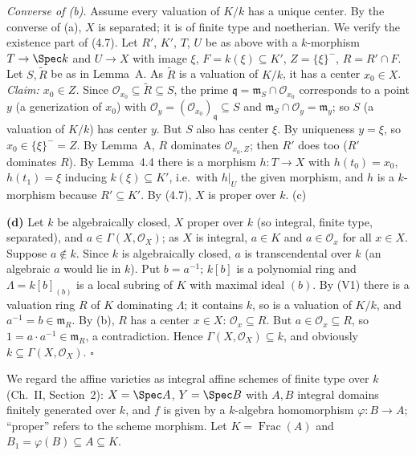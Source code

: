 \documentclass[11pt]{article}
\begin{document}
\emph{Converse of (b).} Assume every valuation of $K/k$ has a unique center. By the converse of (a), $X$ is separated; it is of finite type and noetherian. We verify the existence part of (4.7). Let $R'$, $K'$, $T$, $U$ be as above with a $k$-morphism $T\to\Spec k$ and $U\to X$ with image $\xi$, $F=k(\xi)\subseteq K'$, $Z=\{\xi\}^-$, $R=R'\cap F$. Let $S,\tilde R$ be as in Lemma~A. As $\tilde R$ is a valuation of $K/k$, it has a center $x_0\in X$. \emph{Claim: $x_0\in Z$.} Since $\mathcal O_{x_0}\subseteq\tilde R\subseteq S$, the prime $\mathfrak q=\mathfrak m_S\cap\mathcal O_{x_0}$ corresponds to a point $y$ (a generization of $x_0$) with $\mathcal O_y=(\mathcal O_{x_0})_{\mathfrak q}\subseteq S$ and $\mathfrak m_S\cap\mathcal O_y=\mathfrak m_y$; so $S$ (a valuation of $K/k$) has center $y$. But $S$ also has center $\xi$. By uniqueness $y=\xi$, so $x_0\in\{\xi\}^-=Z$. By Lemma~A, $R$ dominates $\mathcal O_{x_0,Z}$; then $R'$ does too ($R'$ dominates $R$). By Lemma~4.4 there is a morphism $h:T\to X$ with $h(t_0)=x_0$, $h(t_1)=\xi$ inducing $k(\xi)\subseteq K'$, i.e.\ with $h|_U$ the given morphism, and $h$ is a $k$-morphism because $R'\subseteq K'$. By (4.7), $X$ is proper over $k$. \hfill(c)

\textbf{(d)} Let $k$ be algebraically closed, $X$ proper over $k$ (so integral, finite type, separated), and $a\in\Gamma(X,\mathcal O_X)$; as $X$ is integral, $a\in K$ and $a\in\mathcal O_x$ for all $x\in X$. Suppose $a\notin k$. Since $k$ is algebraically closed, $a$ is transcendental over $k$ (an algebraic $a$ would lie in $k$). Put $b=a^{-1}$; $k[b]$ is a polynomial ring and $\Lambda=k[b]_{(b)}$ is a local subring of $K$ with maximal ideal $(b)$. By (V1) there is a valuation ring $R$ of $K$ dominating $\Lambda$; it contains $k$, so is a valuation of $K/k$, and $a^{-1}=b\in\mathfrak m_R$. By (b), $R$ has a center $x\in X$: $\mathcal O_x\subseteq R$. But $a\in\mathcal O_x\subseteq R$, so $1=a\cdot a^{-1}\in\mathfrak m_R$, a contradiction. Hence $\Gamma(X,\mathcal O_X)\subseteq k$, and obviously $k\subseteq\Gamma(X,\mathcal O_X)$. \hfill$\square$

\pf
We regard the affine varieties as integral affine schemes of finite type over $k$ (Ch.~II, Section~2): $X=\Spec A$, $Y=\Spec B$ with $A,B$ integral domains finitely generated over $k$, and $f$ is given by a $k$-algebra homomorphism $\varphi:B\to A$; ``proper'' refers to the scheme morphism. Let $K=\operatorname{Frac}(A)$ and $B_1=\varphi(B)\subseteq A\subseteq K$.
\end{document}
